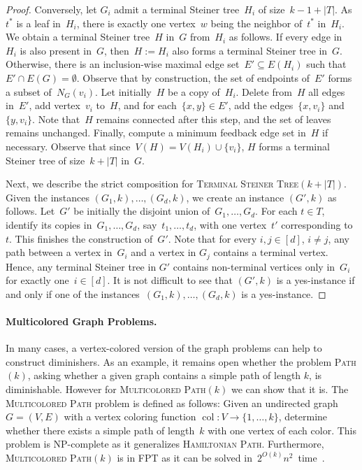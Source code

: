 \documentclass[11pt,a4,USenglish]{article}
\newcommand{\prob}[1]{\textsc{#1}}
\newcommand{\pprob}[2]{\prob{#1}$(#2)$}
\newcommand{\NP}{\textnormal{NP}}
\DeclareMathOperator{\col}{col}
\theoremstyle{definition}
\theoremstyle{plain}
\theoremstyle{remark}
\begin{document}
{\begin{proof}
  Conversely, let $G_i$ admit a terminal Steiner tree~$H_i$ of size~$k-1+|T|$.
  As~$t^*$ is a leaf in~$H_i$, there is exactly one vertex~$w$ being the neighbor of~$t^*$ in~$H_i$.
%
  We obtain a terminal Steiner tree~$H$ in~$G$ from~$H_i$ as follows.
  If every edge in~$H_i$ is also present in~$G$, then~$H:=H_i$ also forms a terminal Steiner tree in~$G$.
  Otherwise, there is an inclusion-wise maximal edge set~$E'\subseteq E(H_i)$ such that $E'\cap E(G)=\emptyset$.
  Observe that by construction, the set of endpoints of~$E'$ forms a subset of~$N_G(v_i)$.
  Let initially~$H$ be a copy of~$H_i$. 
  Delete from~$H$ all edges in~$E'$, add vertex~$v_i$ to~$H$, and for each~$\{x,y\}\in E'$, add the edges~$\{x,v_i\}$ and~$\{y,v_i\}$.
  Note that~$H$ remains connected after this step, and the set of leaves remains unchanged.
  Finally, compute a minimum feedback edge set in~$H$ if necessary.
  Observe that since~$V(H)=V(H_i)\cup\{v_i\}$, $H$ forms a terminal Steiner tree of size~$k+|T|$ in~$G$.
  
%
%
%
%
%

  Next, we describe the strict composition for \pprob{Terminal Steiner Tree}{k+|T|}. 
  Given the instances $(G_1,k),\ldots,(G_d,k)$, we create an instance $(G',k)$ as follows.
  Let~$G'$ be initially the disjoint union of~$G_1,\ldots,G_d$.
  For each $t\in T$, identify its copies in~$G_1,\ldots,G_d$, say~$t_1,\ldots,t_d$, with one vertex~$t'$ corresponding to~$t$.
  This finishes the construction of~$G'$.
  Note that for every $i,j\in[d]$, $i\neq j$, any path between a vertex in~$G_i$ and a vertex in $G_j$ contains a terminal vertex.
  Hence, any terminal Steiner tree in $G'$ contains non-terminal vertices only in~$G_i$ for exactly one~$i\in[d]$.
  It is not difficult to see that $(G',k)$ is a yes-instance if and only if one of the instances~$(G_1,k),\ldots,(G_d,k)$ is a yes-instance.
  \end{proof}
}
%
%
%



\paragraph{Multicolored Graph Problems.}
\label{ssec:multicol}
In many cases, a vertex-colored version of the graph problems can help to construct diminishers. As an example, it remains open whether the problem \pprob{Path}{k}, asking whether a given graph contains a simple path of length $k$, is diminishable. However for \pprob{Multicolored Path}{k} we can show that it is.
The \prob{Multicolored Path} problem is defined as follows: Given an undirected graph~$G=(V,E)$ with a vertex coloring function $\col: V \to \{1,\ldots,k\}$, determine whether there exists a simple path of length~$k$ with one vertex of each color. This problem is \NP{}-complete as it generalizes \prob{Hamiltonian Path}. 
Furthermore, \pprob{Multicolored Path}{k} is in FPT as it can be solved in~$2^{O(k)} n^2$~time~\cite{AlonYZ95}.%
\end{document}
